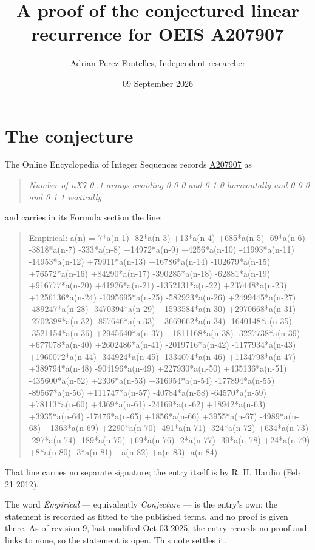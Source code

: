 \documentclass[11pt]{article}
\title{A proof of the conjectured linear recurrence for OEIS A207907}
\author{Adrian Perez Fontelles, Independent researcher}
\date{09 September 2026}
\theoremstyle{definition}
\begin{document}
\maketitle
\section{The conjecture}

The Online Encyclopedia of Integer Sequences records \href{https://oeis.org/A207907}{A207907} as

\begin{quote}\itshape Number of nX7 0..1 arrays avoiding 0 0 0 and 0 1 0 horizontally and 0 0 0 and 0 1 1 vertically\end{quote}

and carries in its Formula section the line:

\begin{quote}\ttfamily Empirical: a(n) = 7*a(n-1) -82*a(n-3) +13*a(n-4) +685*a(n-5) -69*a(n-6) -3818*a(n-7) -333*a(n-8) +14972*a(n-9) +4256*a(n-10) -41993*a(n-11) -14953*a(n-12) +79911*a(n-13) +16786*a(n-14) -102679*a(n-15) +76572*a(n-16) +84290*a(n-17) -390285*a(n-18) -62881*a(n-19) +916777*a(n-20) +41926*a(n-21) -1352131*a(n-22) +237448*a(n-23) +1256136*a(n-24) -1095695*a(n-25) -582923*a(n-26) +2499445*a(n-27) -489247*a(n-28) -3470394*a(n-29) +1593584*a(n-30) +2970668*a(n-31) -2702398*a(n-32) -857646*a(n-33) +3669662*a(n-34) -1640148*a(n-35) -3521154*a(n-36) +2945640*a(n-37) +1811168*a(n-38) -3227738*a(n-39) +677078*a(n-40) +2602486*a(n-41) -2019716*a(n-42) -1177934*a(n-43) +1960072*a(n-44) -344924*a(n-45) -1334074*a(n-46) +1134798*a(n-47) +389794*a(n-48) -904196*a(n-49) +227930*a(n-50) +435136*a(n-51) -435600*a(n-52) +2306*a(n-53) +316954*a(n-54) -177894*a(n-55) -89567*a(n-56) +111747*a(n-57) -40784*a(n-58) -64570*a(n-59) +78113*a(n-60) +4369*a(n-61) -24169*a(n-62) +18942*a(n-63) +3935*a(n-64) -17476*a(n-65) +1856*a(n-66) +3955*a(n-67) -4989*a(n-68) +1363*a(n-69) +2290*a(n-70) -491*a(n-71) -324*a(n-72) +634*a(n-73) -297*a(n-74) -189*a(n-75) +69*a(n-76) -2*a(n-77) -39*a(n-78) +24*a(n-79) +8*a(n-80) -3*a(n-81) +a(n-82) +a(n-83) -a(n-84)\end{quote}

That line carries no separate signature; the entry itself is by R. H. Hardin (Feb 21 2012).

The word {\itshape Empirical} --- equivalently {\itshape Conjecture} --- is the entry's own: the statement is recorded as fitted to the published terms, and no proof is given there. As of revision 9, last modified Oct 03 2025, the entry records no proof and links to none, so the statement is open. This note settles it.
\end{document}
